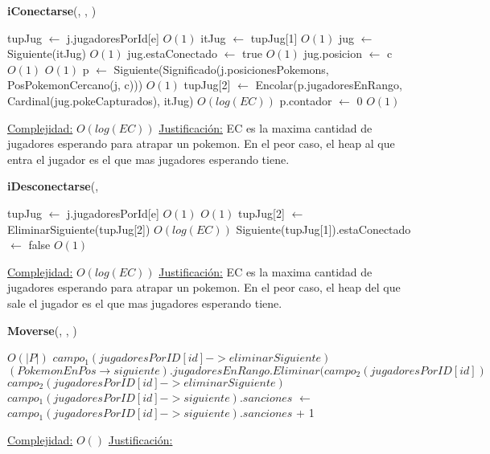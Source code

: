 \begin{algorithm}[H]{\textbf{iConectarse}(, , )}
	\begin{algorithmic}
		\State tupJug $\gets$ j.jugadoresPorId[e]	\Comment $O(1)$
		\State itJug $\gets$ tupJug[1]	\Comment $O(1)$
		\State jug $\gets$ Siguiente(itJug)	\Comment $O(1)$
		\State jug.estaConectado $\gets$ true	\Comment $O(1)$
		\State jug.posicion $\gets$ c	\Comment $O(1)$
			\Comment $O(1)$
			\State p $\gets$ Siguiente(Significado(j.posicionesPokemons, PosPokemonCercano(j, c)))	\Comment $O(1)$
			\State tupJug[2] $\gets$ Encolar(p.jugadoresEnRango, Cardinal(jug.pokeCapturados), itJug)	\Comment $O(log(EC))$
			\State p.contador $\gets$ 0	\Comment $O(1)$
		\EndIf
	
		\medskip
		\Statex \underline{Complejidad:} $O(log(EC))$
		\Statex \underline{Justificación:} EC es la maxima cantidad de jugadores esperando para atrapar un pokemon. En el peor caso, el heap al que entra el jugador es el que mas jugadores esperando tiene.
    \end{algorithmic}
\end{algorithm}

\begin{algorithm}[H]{\textbf{iDesconectarse}(, } 
	\begin{algorithmic}
		\State tupJug $\gets$ j.jugadoresPorId[e]	\Comment $O(1)$
			\Comment $O(1)$
			\State tupJug[2] $\gets$ EliminarSiguiente(tupJug[2])	\Comment $O(log(EC))$
		\EndIf
		\State Siguiente(tupJug[1]).estaConectado $\gets$ false	\Comment $O(1)$
	
		\medskip
		\Statex \underline{Complejidad:} $O(log(EC))$
		\Statex \underline{Justificación:} EC es la maxima cantidad de jugadores esperando para atrapar un pokemon. En el peor caso, el heap del que sale el jugador es el que mas jugadores esperando tiene.
    \end{algorithmic}
\end{algorithm}

\begin{algorithm}[H]{\textbf{Moverse}(, , )}{}
	\begin{algorithmic}
	 \Comment $O(|P|)$
			\State $campo_1(jugadoresPorID[id]->eliminarSiguiente)$
				\State $(PokemonEnPos \rightarrow siguiente).jugadoresEnRango.Eliminar(campo_2(jugadoresPorID[id])$
				\State $campo_2(jugadoresPorID[id]->eliminarSiguiente)$
			\Else
				\State $campo_1(jugadoresPorID[id]->siguiente).sanciones$ $\gets$ $campo_1(jugadoresPorID[id]->siguiente).sanciones$ + 1
			\EndIf
		\EndIf
	\EndIf

\medskip
\Statex \underline{Complejidad:} $O()$
\Statex \underline{Justificación:}
\end{algorithmic}
\end{algorithm}

